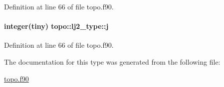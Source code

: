 Definition at line 66 of file topo.\-f90.

\hypertarget{structtopo_1_1lj2__type_ac35b83bc7424b44e537b844e8d7f42ba}{
\paragraph[{j}]{\setlength{\rightskip}{0pt plus 5cm}integer(tiny) topo\-::lj2\-\_\-type\-::j}}\label{structtopo_1_1lj2__type_ac35b83bc7424b44e537b844e8d7f42ba}


Definition at line 66 of file topo.\-f90.



The documentation for this type was generated from the following file\-:\begin{DoxyCompactItemize}
\item 
\hyperlink{topo_8f90}{topo.\-f90}\end{DoxyCompactItemize}
